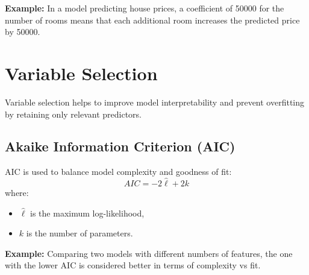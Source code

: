 \documentclass[twocolumn]{article}
\begin{document}
\textbf{Example:} In a model predicting house prices, a coefficient of 50000 for the number of rooms means that each additional room increases the predicted price by 50000.

\section{Variable Selection}
Variable selection helps to improve model interpretability and prevent overfitting by retaining only relevant predictors.

\subsection{Akaike Information Criterion (AIC)}
AIC is used to balance model complexity and goodness of fit:
\begin{equation}
    AIC = -2\hat{\ell} + 2k
\end{equation}
where:
\begin{itemize}
    \item $\hat{\ell}$ is the maximum log-likelihood,
    \item $k$ is the number of parameters.
\end{itemize}

\textbf{Example:} Comparing two models with different numbers of features, the one with the lower AIC is considered better in terms of complexity vs fit.
\end{document}
